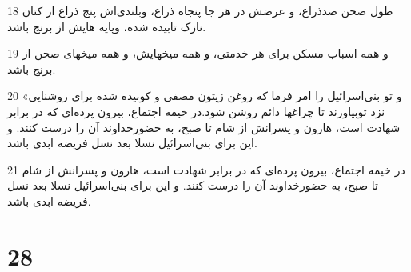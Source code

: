 \par 18 طول صحن صدذراع، و عرضش در هر جا پنجاه ذراع، وبلندی‌اش پنج ذراع از کتان نازک تابیده شده، وپایه هایش از برنج باشد.
\par 19 و همه اسباب مسکن برای هر خدمتی، و همه میخهایش، و همه میخهای صحن از برنج باشد.
\par 20 «و تو بنی‌اسرائیل را امر فرما که روغن زیتون مصفی و کوبیده شده برای روشنایی نزد توبیاورند تا چراغها دائم روشن شود.در خیمه اجتماع، بیرون پرده‌ای که در برابر شهادت است، هارون و پسرانش از شام تا صبح، به حضورخداوند آن را درست کنند. و این برای بنی‌اسرائیل نسلا بعد نسل فریضه ابدی باشد.
\par 21 در خیمه اجتماع، بیرون پرده‌ای که در برابر شهادت است، هارون و پسرانش از شام تا صبح، به حضورخداوند آن را درست کنند. و این برای بنی‌اسرائیل نسلا بعد نسل فریضه ابدی باشد.
 
\chapter{28}


